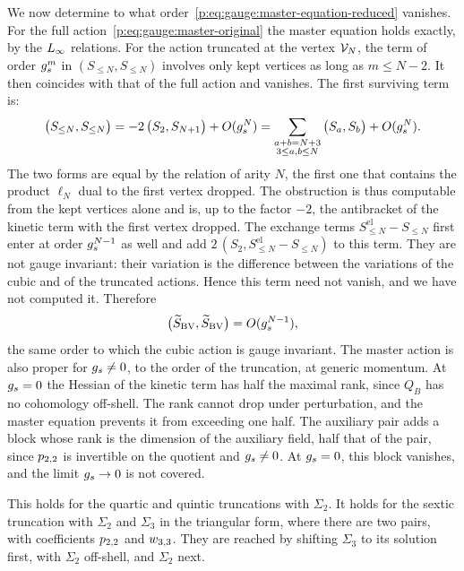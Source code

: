 We now determine to what order~\eqref{p:eq:gauge:master-equation-reduced} vanishes.
For the full action~\eqref{p:eq:gauge:master-original} the master equation holds exactly, by the $\Loo$ relations.
For the action truncated at the vertex $\vertex{N}$, the term of order $\gs^m$ in $(S_{\le N}, S_{\le N})$ involves only kept vertices as long as $m \le N - 2$.
It then coincides with that of the full action and vanishes.
The first surviving term is:
\begin{equation}
  \label{p:eq:gauge:master-truncation}
  \big( S_{\le N}, S_{\le N} \big)
    = - 2 \, \big( S_2, S_{N+1} \big) + O(\gs^N)
    = \sum_{\substack{a + b = N + 3 \\ 3 \le a, b \le N}} \big( S_a, S_b \big) + O(\gs^N).
\end{equation}
The two forms are equal by the relation of arity $N$, the first one that contains the product $\ell_N$ dual to the first vertex dropped.
The obstruction is thus computable from the kept vertices alone and is, up to the factor $-2$, the antibracket of the kinetic term with the first vertex dropped.
The exchange terms $S^{\mathrm{el}}_{\le N} - S_{\le N}$ first enter at order $\gs^{N-1}$ as well and add $2 \, (S_2, S^{\mathrm{el}}_{\le N} - S_{\le N})$ to this term.
They are not gauge invariant: their variation is the difference between the variations of the cubic and of the truncated actions.
  Hence this term need not vanish, and we have not computed it.
Therefore
\begin{equation}
  \label{p:eq:gauge:master-equation-order}
  \big( \caction[\mathrm{BV}], \caction[\mathrm{BV}] \big)
    = O(\gs^{N-1}),
\end{equation}
the same order to which the cubic action is gauge invariant.
The master action is also proper for $\gs \ne 0$, to the order of the truncation, at generic momentum.
At $\gs = 0$ the Hessian of the kinetic term has half the maximal rank, since $Q_B$ has no cohomology off-shell.
The rank cannot drop under perturbation, and the master equation prevents it from exceeding one half.
The auxiliary pair adds a block whose rank is the dimension of the auxiliary field, half that of the pair, since $\sprod{2}{2}$ is invertible on the quotient and $\gs \ne 0$.
At $\gs = 0$, this block vanishes, and the limit $\gs \to 0$ is not covered.

This holds for the quartic and quintic truncations with $\Sigma_2$.
It holds for the sextic truncation with $\Sigma_2$ and $\Sigma_3$ in the triangular form, where there are two pairs, with coefficients $\sprod{2}{2}$ and $\wprod{3}{3}$.
They are reached by shifting $\Sigma_3$ to its solution first, with $\Sigma_2$ off-shell, and $\Sigma_2$ next.

